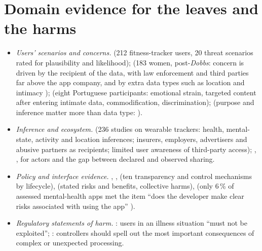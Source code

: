 \section{Domain evidence for the leaves and the harms}
\begin{itemize}
\item \emph{Users' scenarios and concerns.}  (212 fitness-tracker users, 20 threat scenarios rated for plausibility and likelihood);  (183 women, post-\emph{Dobbs}: concern is driven by the recipient of the data, with law enforcement and third parties far above the app company, and by extra data types such as location and intimacy );  (eight Portuguese participants: emotional strain, targeted content after entering intimate data, commodification, discrimination);  (purpose and inference matter more than data type: ).
\item \emph{Inference and ecosystem.}  (236 studies on wearable trackers: health, mental-state, activity and location inferences; insurers, employers, advertisers and abusive partners as recipients; limited user awareness of third-party access); , ,  for actors and the gap between declared and observed sharing.
\item \emph{Policy and interface evidence.} , ,  (ten transparency and control mechanisms by lifecycle),  (stated risks and benefits, collective harms),  (only 6\,\% of assessed mental-health apps met the item ``does the developer make clear risks associated with using the app'' ).
\item \emph{Regulatory statements of harm.} : users in an illness situation ``must not be exploited''; : controllers should spell out the most important consequences of complex or unexpected processing.
\end{itemize}

